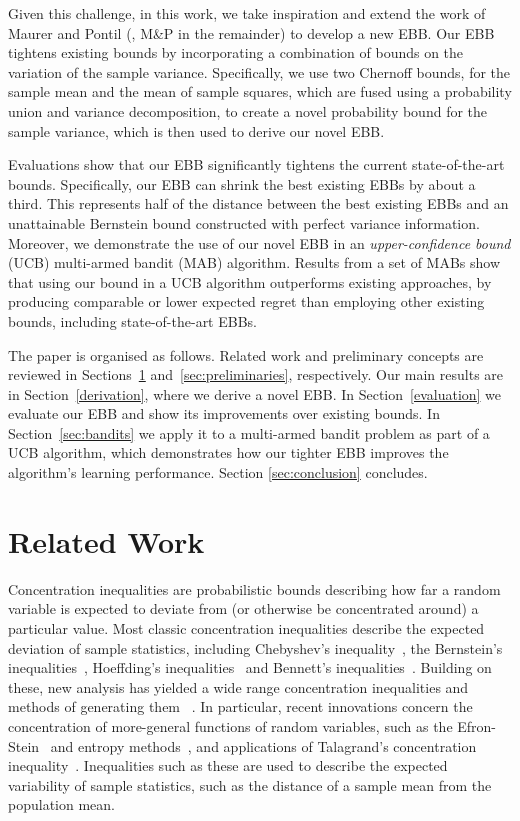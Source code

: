 \documentclass[runningheads, envcountsame, a4paper]{llncs}
\begin{document}
Given this challenge, in this work, we take inspiration and extend the work of  Maurer and Pontil (\cite{Maurer50empiricalbernstein}, M\&P in the remainder)
to develop a new EBB.
Our EBB tightens existing bounds by incorporating a combination of bounds on the variation of the sample variance.
Specifically, we use two Chernoff bounds, for the sample mean and the mean of sample squares, which are fused using a probability union and variance decomposition,
to create a novel probability bound for the sample variance, which is then used to derive our novel EBB.

Evaluations show that our EBB significantly tightens the current state-of-the-art bounds. 
Specifically, our EBB can shrink the best existing EBBs by about a third. This represents half of the distance between the best existing EBBs and an unattainable Bernstein bound constructed with perfect variance information.
Moreover, we demonstrate the use of our novel EBB in an \textit{upper-confidence bound} (UCB) multi-armed bandit (MAB) algorithm.  
Results from a set of MABs show that using our bound in a UCB algorithm outperforms existing approaches, by producing comparable or lower expected regret than employing other existing bounds, including state-of-the-art EBBs.


The paper is organised as follows. 
Related work and preliminary concepts are reviewed in Sections~\ref{sec:related-work} and~\ref{sec:preliminaries}, respectively.
Our main results are in Section~\ref{derivation}, where we derive %
a novel EBB.
In Section~\ref{evaluation} we evaluate our EBB and show its improvements over existing bounds. 
In Section~\ref{sec:bandits} we apply it to a multi-armed bandit problem as part of a UCB algorithm, which demonstrates how our tighter EBB improves the algorithm's learning performance.
Section \ref{sec:conclusion} concludes.


\section{Related Work}\label{sec:related-work}
Concentration inequalities are probabilistic bounds describing how far a random variable is expected to deviate from (or otherwise be concentrated around) a particular value.
Most classic concentration inequalities describe the expected deviation of sample statistics, including 
Chebyshev's inequality~\cite{Chebyshev1}, 
the Bernstein's inequalities~\cite{Burnstein1}, 
Hoeffding's inequalities~\cite{hoeffding1} and 
Bennett's inequalities~\cite{10.2307/2282438}.
Building on these, new analysis has yielded a wide range concentration inequalities and methods of generating them ~\cite{MR3363542,Boucheron2004}. 
In particular, recent innovations concern the concentration of more-general functions of random variables, such as 
the Efron-Stein~\cite{efron1981} and 
entropy methods~\cite{Boucheron_concentrationinequalities}, and 
applications of Talagrand's concentration inequality~\cite{Talagrand1995}.
Inequalities such as these are used to describe the expected variability of sample statistics, such as the distance of a sample mean from the population mean.
\end{document}
